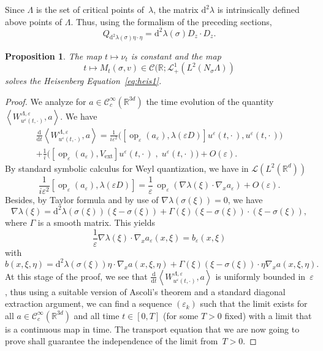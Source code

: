 \documentclass[10pt]{amsart}
\newtheorem{prop}[cdrthm]{Proposition}
\theoremstyle{definition}
\DeclareMathOperator{\ext}{ext}
\DeclareMathOperator{\op}{op}
\newcommand*\R{{\mathbb R}}
\newcommand*\eps{\varepsilon}
\numberwithin{equation}{section}
\newcommand*{\dd}{\mathrm{d}}
\newcommand*{\dt}{\dd t}
\begin{document}
Since $\Lambda$ is the set of critical points of~$\lambda$, the matrix $\dd^2 \lambda$ is intrinsically defined above points of $\Lambda$. Thus, using the formalism of the preceding sections,
\[
Q_{\dd^2\lambda(\sigma)\eta\cdot\eta}= \dd^2\lambda(\sigma)D_z\cdot D_z.
\]

\begin{prop}\label{prop5.1}
The map $t\mapsto \nu_t$ is constant and the map
\[
t\mapsto M_t(\sigma,v)\in \mathcal{C}(\R;\mathcal{L}_+^1(L^2(N_\sigma\Lambda))
\]
solves the Heisenberg Equation~\eqref{eq:heis1}.
\end{prop}

\begin{proof}
We analyze for $a\in\mathcal{C}_c^\infty(\R^{3d})$ the time evolution of the quantity\linebreak $\left\langle W^{\Lambda,\eps}_{u^{\eps}(t,\cdot)},a\right\rangle.$ We have
\begin{multline*}
\frac{\dd}{\dt} \left\langle W^{\Lambda,\eps}_{u^{\eps}(t,\cdot)},a\right\rangle=\frac{1}{i\eps^2} \big(\left[\op_\eps(a_\eps),\lambda(\eps D)\right] u^\eps(t,\cdot\,),u^\eps(t,\cdot\,)\big)\\ + \frac{1}{i}
\big(\left[\op_\eps(a_\eps),V_{\ext}\right] u^\eps(t,\cdot\,)\;,\;u^\eps(t,\cdot\,)\big)+O(\eps).
\end{multline*}
By standard symbolic calculus for Weyl quantization, we have in ${\mathcal L}(L^2(\R^d))$
\[
\frac{1}{i\eps^2}\left[\op_\eps(a_\eps),\lambda(\eps D)\right] = \frac{1}{\eps} \,\op_\eps(\nabla\lambda(\xi) \cdot\nabla_x a_\eps) +O(\eps).
\]
Besides, by Taylor formula and by use of $\nabla\lambda (\sigma(\xi))=0$, we have
\begin{equation}\label{taylor_lambda}
\nabla \lambda(\xi) = \dd^2\lambda(\sigma(\xi)) \left(\xi-\sigma(\xi)\right) + \Gamma(\xi) \left(\xi-\sigma(\xi) \right)\cdot\left(\xi-\sigma(\xi)\right),
\end{equation}
where $\Gamma$ is a smooth matrix. This yields
\[
\frac{1}{\eps} \nabla\lambda(\xi) \cdot\nabla_x a_\eps(x,\xi) = b_\eps(x,\xi)
\]
with
\[
b(x,\xi,\eta)=\dd^2\lambda(\sigma(\xi))\eta\cdot \nabla_xa (x,\xi,\eta) + \Gamma(\xi) \left(\xi-\sigma(\xi) \right)\cdot\eta \nabla_x a(x,\xi,\eta).
\]
At this stage of the proof, we see that $\frac{\dd}{\dt} \left\langle W^{\Lambda,\eps}_{u^{\eps}(t,\cdot)},a\right\rangle$ is uniformly bounded in~$\eps$, thus using a suitable version of Ascoli's theorem and a standard diagonal extraction argument, we can find a sequence $(\eps_k)$ such that the limit exists for all $a\in{\mathcal C}_c^\infty(\R^{3d})$ and all time $t\in[0,T]$ (for some $T>0$ fixed) with a limit that is a continuous map in time. The transport equation that we are now going to prove shall guarantee the independence of the limit from~$T>0$.


\end{proof}
\end{document}
